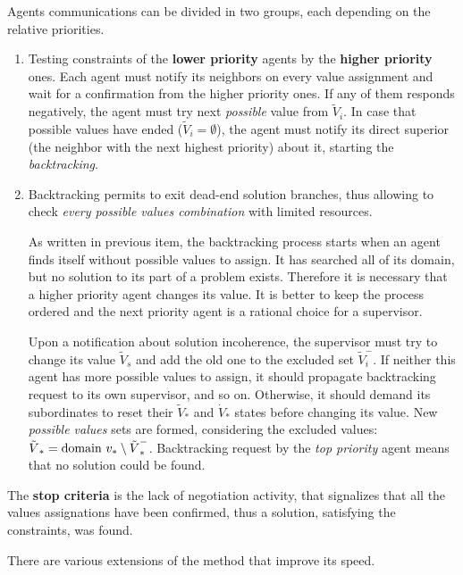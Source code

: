 \documentclass[ThesisDoc]{subfiles}
\begin{document}
Agents communications can be divided in two groups, each depending on the relative
priorities.
\begin{enumerate}
  \item Testing constraints of the \textbf{lower priority} agents by the
    \textbf{higher priority} ones.
    Each agent must notify its neighbors on every value assignment and wait
    for a confirmation from the higher priority ones. If any of them responds
    negatively, the agent must try next \emph{possible} value from ${\tilde V}_i$.
    In case that possible values have ended (${\tilde V}_i = \emptyset$), the agent
    must notify its direct superior (the neighbor with the next highest priority)
    about it, starting the \emph{backtracking}.
  \item Backtracking permits to exit dead-end solution branches, thus allowing
    to check \emph{every possible values combination} with limited resources.

    As written in previous item, the backtracking process starts when an agent
    finds itself without possible values to assign. It has searched all of its
    domain, but no solution to its part of a problem exists. Therefore it is
    necessary that a higher priority agent changes its value. It is better to
    keep the process ordered and the next priority agent is a rational choice
    for a supervisor.

    Upon a notification about solution incoherence, the supervisor
    must try to change its value ${\tilde V}_s$ and add the old one to the
    excluded set ${\tilde V}_i^-$.
    If neither this agent has more possible values to assign, it should propagate
    backtracking request to its own supervisor, and so on. Otherwise, it should
    demand its subordinates to reset their ${\tilde V}_*$ and ${\dot V}_*$ states
    before changing its value. New \emph{possible values} sets are formed, considering
    the excluded values: ${\tilde V}_* = \mathrm{domain}~v_* \setminus {\tilde V}_*^-$.
    Backtracking request by the \emph{top priority} agent means that no solution
    could be found.
\end{enumerate}

The \textbf{stop criteria} is the lack of negotiation activity, that signalizes
that all the values assignations have been confirmed, thus a solution, satisfying
the constraints, was found.

\bigskip

\noindent
There are various extensions of the method that improve its speed.
\end{document}

